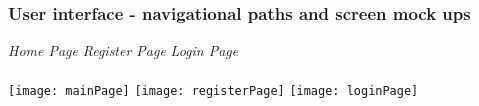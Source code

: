\documentclass[15, notitlepage]{article}
\begin{document}
\subsubsection{User interface - navigational paths and screen mock ups}
\textit{Home Page} \hfill \textit{Register Page} \hfill \textit{Login Page} \\\\
\texttt{[image: mainPage]} \hfill
\texttt{[image: registerPage]} \hfill
\texttt{[image: loginPage]} \hfill
\end{document}

